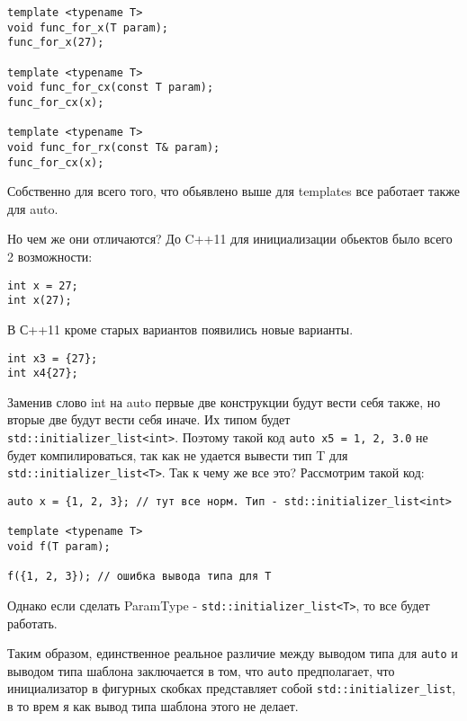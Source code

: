 \begin{verbatim}
template <typename T>
void func_for_x(T param);
func_for_x(27);

template <typename T>
void func_for_cx(const T param);
func_for_cx(x);

template <typename T>
void func_for_rx(const T& param);
func_for_cx(x);
\end{verbatim}

	Собственно для всего того, что обьявлено выше для templates все работает также для auto.
	
	Но чем же они отличаются? До C++11 для инициализации обьектов было всего 2 возможности:
\begin{verbatim}
int x = 27;
int x(27);
\end{verbatim}
	В С++11 кроме старых вариантов появились новые варианты.
	
\begin{verbatim}
int x3 = {27};
int x4{27};
\end{verbatim}
	
	Заменив слово int на auto первые две конструкции будут вести себя также, но вторые две будут вести себя иначе. Их типом будет \texttt{std::initializer_list<int>}. Поэтому такой код \texttt{auto x5 = {1, 2, 3.0}} не будет компилироваться, так как не удается вывести тип T для \texttt{std::initializer_list<T>}. Так к чему же все это? Рассмотрим такой код:
	
\begin{verbatim}
auto x = {1, 2, 3}; // тут все норм. Тип - std::initializer_list<int>

template <typename T>
void f(T param);

f({1, 2, 3}); // ошибка вывода типа для T
\end{verbatim}
	
	Однако если сделать ParamType - \texttt{std::initializer_list<T>}, то все будет работать.
	
	Таким образом, единственное реальное различие между выводом типа для \texttt{auto} и выводом типа шаблона заключается в том, что \texttt{auto} предполагает, что инициализатор в фигурных скобках представляет собой \texttt{std::initializer_list}, в то врем я как вывод типа шаблона этого не делает.
	
